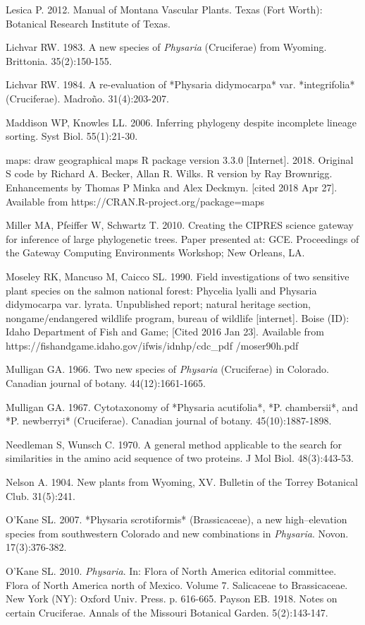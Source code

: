 Lesica P. 2012. Manual of Montana Vascular Plants. Texas (Fort Worth): Botanical Research Institute of Texas.

Lichvar RW. 1983. A new species of \textit{Physaria} (Cruciferae) from Wyoming.  Brittonia. 35(2):150-155.

Lichvar RW. 1984. A re-evaluation of *Physaria didymocarpa* var. *integrifolia* (Cruciferae). Madroño. 31(4):203-207.

Maddison WP, Knowles LL. 2006. Inferring phylogeny despite incomplete lineage sorting. Syst Biol. 55(1):21-30.

maps: draw geographical maps R package version 3.3.0 [Internet]. 2018. Original S code by Richard A. Becker, Allan R. Wilks. R version by Ray Brownrigg. Enhancements by Thomas P Minka and Alex Deckmyn. [cited 2018 Apr 27]. Available from https://CRAN.R-project.org/package=maps 

Miller MA, Pfeiffer W, Schwartz T. 2010. Creating the CIPRES science gateway for inference of large phylogenetic trees. Paper presented at: GCE. Proceedings of the Gateway Computing Environments Workshop; New Orleans, LA.

Moseley RK, Mancuso M, Caicco SL. 1990. Field investigations of two sensitive plant species on the salmon national forest: Phycelia lyalli and Physaria didymocarpa var. lyrata. Unpublished report; natural heritage section, nongame/endangered wildlife program, bureau of wildlife [internet]. Boise (ID): Idaho Department of Fish and Game; [Cited 2016 Jan 23]. Available from https://fishandgame.idaho.gov/ifwis/idnhp/cdc\_pdf /moser90h.pdf

Mulligan GA. 1966. Two new species of \textit{Physaria} (Cruciferae) in Colorado. Canadian journal of botany. 44(12):1661-1665.

Mulligan GA. 1967. Cytotaxonomy of *Physaria acutifolia*, *P. chambersii*, and *P. newberryi* (Cruciferae). Canadian journal of botany. 45(10):1887-1898.

Needleman S, Wunsch C.  1970. A general method applicable to the search for similarities in the amino acid sequence of two proteins. J Mol Biol. 48(3):443-53.

Nelson A. 1904. New plants from Wyoming, XV. Bulletin of the Torrey Botanical Club. 31(5):241.

O’Kane SL. 2007. *Physaria scrotiformis* (Brassicaceae), a new high–elevation species from southwestern Colorado and new combinations in \textit{Physaria}. Novon. 17(3):376-382.

O’Kane SL. 2010. \textit{Physaria}. In: Flora of North America editorial committee. Flora of North America north of Mexico. Volume 7. Salicaceae to Brassicaceae. New York (NY): Oxford Univ. Press. p. 616-665. 
Payson EB. 1918. Notes on certain Cruciferae. Annals of the Missouri Botanical Garden. 5(2):143-147.

